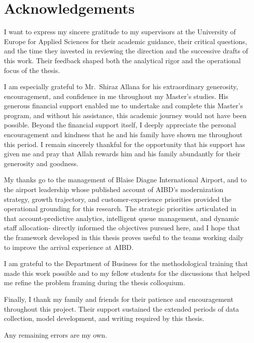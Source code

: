 \chapter*{Acknowledgements}

I want to express my sincere gratitude to my supervisors at the University of Europe for Applied Sciences for their academic guidance, their critical questions, and the time they invested in reviewing the direction and the successive drafts of this work. Their feedback shaped both the analytical rigor and the operational focus of the thesis.

I am especially grateful to Mr.\ Shiraz Allana for his extraordinary generosity, encouragement, and confidence in me throughout my Master's studies. His generous financial support enabled me to undertake and complete this Master's program, and without his assistance, this academic journey would not have been possible. Beyond the financial support itself, I deeply appreciate the personal encouragement and kindness that he and his family have shown me throughout this period. I remain sincerely thankful for the opportunity that his support has given me and pray that Allah rewards him and his family abundantly for their generosity and goodness.

My thanks go to the management of Blaise Diagne International Airport, and to the airport leadership whose published account of AIBD's modernization strategy, growth trajectory, and customer-experience priorities provided the operational grounding for this research. The strategic priorities articulated in that account-predictive analytics, intelligent queue management, and dynamic staff allocation- directly informed the objectives pursued here, and I hope that the framework developed in this thesis proves useful to the teams working daily to improve the arrival experience at AIBD.

I am grateful to the Department of Business for the methodological training that made this work possible and to my fellow students for the discussions that helped me refine the problem framing during the thesis colloquium.

Finally, I thank my family and friends for their patience and encouragement throughout this project. Their support sustained the extended periods of data collection, model development, and writing required by this thesis.

Any remaining errors are my own.